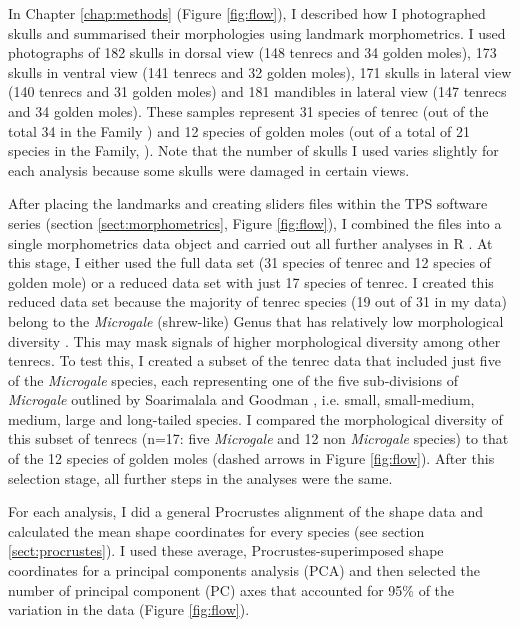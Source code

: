 	In Chapter \ref{chap:methods} (Figure \ref{fig:flow}), I described how I photographed skulls and summarised their morphologies using landmark morphometrics. I used photographs of 182 skulls in dorsal view (148 tenrecs and 34 golden moles), 173 skulls in ventral view (141 tenrecs and 32 golden moles), 171 skulls in lateral view (140 tenrecs and 31 golden moles) and 181 mandibles in lateral view (147 tenrecs and 34 golden moles). These samples represent 31 species of tenrec (out of the total 34 in the Family \citep{Olson2013}) and 12 species of golden moles (out of a total of 21 species in the Family, \citep{Asher2010}). Note that the number of skulls I used varies slightly for each analysis because some skulls were damaged in certain views.
	

	After placing the landmarks and creating sliders files within the TPS software series (section \ref{sect:morphometrics}, Figure \ref{fig:flow}), I combined the files into a single morphometrics data object and carried out all further analyses in R \citep{Team2014}. At this stage, I either used the full data set (31 species of tenrec and 12 species of golden mole) or a reduced data set with just 17 species of tenrec. I created this reduced data set because the majority of tenrec species (19 out of 31 in my data) belong to the \textit{Microgale} (shrew-like) Genus that has relatively low morphological diversity \citep{Soarimalala2011, Jenkins2003}. This may mask signals of higher morphological diversity among other tenrecs. To test this, I created a subset of the tenrec data that included just five of the \textit{Microgale} species, each representing one of the five sub-divisions of \textit{Microgale} outlined by Soarimalala and Goodman \citeyearpar{Soarimalala2011}, i.e. small, small-medium, medium, large and long-tailed species. I compared the morphological diversity of this subset of tenrecs (n=17: five \textit{Microgale} and 12 non \textit{Microgale} species) to that of the 12 species of golden moles (dashed arrows in Figure \ref{fig:flow}). After this selection stage, all further steps in the analyses were the same.
		
	For each analysis, I did a general Procrustes alignment of the shape data and calculated the mean shape coordinates for every species (see section \ref{sect:procrustes}). I used these average, Procrustes-superimposed shape coordinates for a principal components analysis (PCA) and then selected the number of principal component (PC) axes that accounted for 95\% of the variation in the data (Figure \ref{fig:flow}).
	
